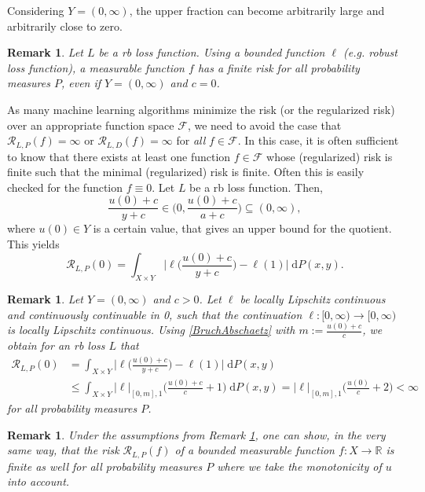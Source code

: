 \documentclass[10pt]{article}
\newcommand{\R}{\mathbb{R}}
\newcommand{\RLP}{\mathcal{R}_{L,P}}
\newcommand{\RLD}{\mathcal{R}_{L,D}}
\newtheorem{remark}[theorem]{Remark}
\begin{document}
Considering $Y = (0, \infty)$, the upper fraction can become arbitrarily large and arbitrarily close to zero.
\begin{remark}
	Let $L$ be a rb loss function.
	Using a bounded function $\ell$ (e.g. robust loss function), a measurable function $f$ has a finite risk for all probability measures $P$, even if $Y = (0, \infty)$ and $c = 0$.
\end{remark}
As many machine learning algorithms minimize the risk (or the regularized risk) over an appropriate function space $\mathcal{F}$, we need to avoid the case that $\RLP(f)=\infty$ or  $\RLD(f)=\infty$ for \emph{all} $f\in \mathcal{F}$.
In this case, it is often sufficient to know that there exists at least one function $f\in\mathcal{F}$ whose (regularized) risk is finite such that the minimal (regularized) risk is finite. Often this is easily checked for the function $f \equiv 0$. 
Let $L$ be a rb loss function. 
Then, 
\begin{equation} \label{BruchAbschaetz}
	\frac{u(0)+c}{y+c} \in \biggl(0, \frac{u(0)+c}{a+c}\biggr) \subseteq (0, \infty),
\end{equation}
where $u(0) \in Y$ is a certain value, that gives an upper bound for the quotient.
This yields
\begin{equation*}
	\mathcal{R}_{L, P}(0) = \int_{X \times Y} \biggl|\ell\biggl(\frac{u(0)+c}{y+c}\biggr) - \ell(1)\biggr| \; \mathrm{d}P(x,y).
\end{equation*}
\begin{remark} \label{finiteRisk_locLipschitz}
	Let $Y = (0, \infty)$ and $c > 0$. 
	Let $\ell$ be locally Lipschitz continuous and continuously continuable in 0, such that the continuation $\ell: [0, \infty) \to [0, \infty)$ is locally Lipschitz continuous.
	Using \eqref{BruchAbschaetz} with $m := \frac{u(0)+c}{c}$, we obtain for 
	an rb loss $L$ that 
	\begin{align*}
		\mathcal{R}_{L, P}(0) &= \int_{X \times Y} \biggl|\ell\biggl(\frac{u(0)+c}{y+c}\biggr) - \ell(1)\biggr| \; \mathrm{d}P(x,y) \\
		&\leq \int_{X \times Y} |\ell|_{[0,m],1} \biggl(\frac{u(0)+c}{c} + 1\biggr) \; \mathrm{d}P(x,y) = |\ell|_{[0,m],1} \biggl(\frac{u(0)}{c} + 2\biggr) < \infty
	\end{align*} 
	for all probability measures $P$.
\end{remark}
\begin{remark}
	Under the assumptions from Remark \ref{finiteRisk_locLipschitz}, one can show, in the very same way, that the risk $\RLP(f)$ of a bounded measurable function $f: X \to \R$ is finite as well for all probability measures $P$ where we take the monotonicity of $u$ into account. 
\end{remark}
\end{document}
